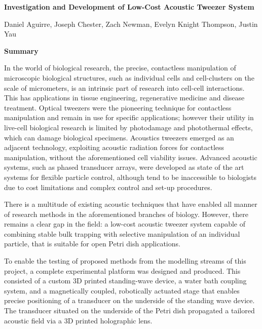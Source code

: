 \documentclass[11pt,a4paper]{article}
\begin{document}

\begin{center}

{\Large \textbf{Investigation and Development of Low-Cost Acoustic Tweezer System}}

\vspace{5mm}


Daniel Aguirre,
Joseph Chester, Zach Newman, Evelyn Knight Thompson, Justin Yau 

\vspace{5mm}

\end{center}

{\Large \noindent \textbf{Summary}}

\noindent In the world of biological research, the precise, contactless manipulation of microscopic biological structures, such as individual cells and cell-clusters on the scale of micrometers, is an intrinsic part of research into cell-cell interactions. This has applications in tissue engineering, regenerative medicine and disease treatment. Optical tweezers were the pioneering technique for contactless manipulation and remain in use for specific applications; however their utility in live-cell biological research is limited by photodamage and photothermal effects, which can damage biological specimens. Acoustics tweezers emerged as an adjacent technology, exploiting acoustic radiation forces for contactless manipulation, without the aforementioned cell viability issues. Advanced acoustic systems, such as phased transducer arrays, were developed as state of the art systems for flexible particle control, although tend to be inaccessible to biologists due to cost limitations and complex control and set-up procedures. 

There is a multitude of existing acoustic techniques that have enabled all manner of research methods in the aforementioned branches of biology. However, there remains a clear gap in the field: a low-cost acoustic tweezer system capable of combining stable bulk trapping with selective manipulation of an individual particle, that is suitable for open Petri dish applications.  

To enable the testing of proposed methods from the modelling streams of this project, a complete experimental platform was designed and produced. This consisted of a custom 3D printed standing-wave device, a water bath coupling system, and a magnetically coupled, robotically actuated stage that enables precise positioning of a transducer on the underside of the standing wave device. The transducer situated on the underside of the Petri dish propagated a tailored acoustic field via a 3D printed holographic lens.   
\end{document}
